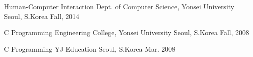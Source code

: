 


\begin{cvhonors}
  \cvhonor
    {Human-Computer Interaction} %
    {Dept. of Computer Science, Yonsei University} %
    {Seoul, S.Korea} %
    {Fall, 2014} %

  \cvhonor
    {C Programming} %
    {Engineering College, Yonsei University} %
    {Seoul, S.Korea} %
    {Fall, 2008} %

  \cvhonor
    {C Programming} %
    {YJ Education} %
    {Seoul, S.Korea} %
    {Mar. 2008} %

\end{cvhonors}
